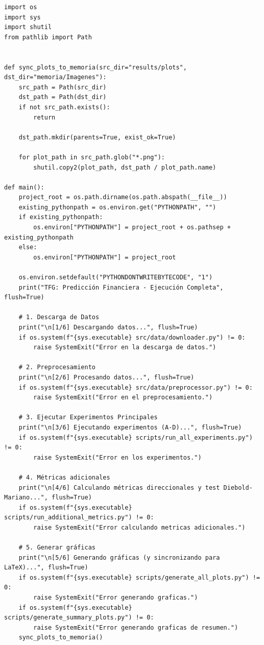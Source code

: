 \begin{lstlisting}[frame=single, caption={Script de ejecucion principal}]
import os
import sys
import shutil
from pathlib import Path


def sync_plots_to_memoria(src_dir="results/plots", dst_dir="memoria/Imagenes"):
    src_path = Path(src_dir)
    dst_path = Path(dst_dir)
    if not src_path.exists():
        return

    dst_path.mkdir(parents=True, exist_ok=True)

    for plot_path in src_path.glob("*.png"):
        shutil.copy2(plot_path, dst_path / plot_path.name)

def main():
    project_root = os.path.dirname(os.path.abspath(__file__))
    existing_pythonpath = os.environ.get("PYTHONPATH", "")
    if existing_pythonpath:
        os.environ["PYTHONPATH"] = project_root + os.pathsep + existing_pythonpath
    else:
        os.environ["PYTHONPATH"] = project_root

    os.environ.setdefault("PYTHONDONTWRITEBYTECODE", "1")
    print("TFG: Predicción Financiera - Ejecución Completa", flush=True)

    # 1. Descarga de Datos
    print("\n[1/6] Descargando datos...", flush=True)
    if os.system(f"{sys.executable} src/data/downloader.py") != 0:
        raise SystemExit("Error en la descarga de datos.")
    
    # 2. Preprocesamiento
    print("\n[2/6] Procesando datos...", flush=True)
    if os.system(f"{sys.executable} src/data/preprocessor.py") != 0:
        raise SystemExit("Error en el preprocesamiento.")
    
    # 3. Ejecutar Experimentos Principales
    print("\n[3/6] Ejecutando experimentos (A-D)...", flush=True)
    if os.system(f"{sys.executable} scripts/run_all_experiments.py") != 0:
        raise SystemExit("Error en los experimentos.")
    
    # 4. Métricas adicionales
    print("\n[4/6] Calculando métricas direccionales y test Diebold-Mariano...", flush=True)
    if os.system(f"{sys.executable} scripts/run_additional_metrics.py") != 0:
        raise SystemExit("Error calculando metricas adicionales.")

    # 5. Generar gráficas
    print("\n[5/6] Generando gráficas (y sincronizando para LaTeX)...", flush=True)
    if os.system(f"{sys.executable} scripts/generate_all_plots.py") != 0:
        raise SystemExit("Error generando graficas.")
    if os.system(f"{sys.executable} scripts/generate_summary_plots.py") != 0:
        raise SystemExit("Error generando graficas de resumen.")
    sync_plots_to_memoria()
    

\end{lstlisting}

